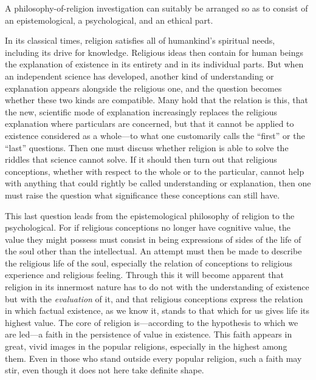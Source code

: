 \documentclass[12pt,a4paper]{book}
\newcommand{\opage}[1]{\marginnote{\footnotesize\textit{[#1]}}}
\begin{document}
A philosophy-of-religion investigation can suitably be arranged so as to
consist of an epistemological, a psychological, and an ethical part.

In its classical times, religion satisfies all of humankind's spiritual
needs, including its drive for knowledge. Religious ideas then contain
for human beings the explanation of existence in its entirety and in its
individual parts. But when an independent science has developed, another
kind of understanding or explanation appears alongside the religious
one, and the question becomes whether these two kinds are compatible.
Many hold that the relation is this, that the new, scientific mode of
explanation increasingly replaces the religious explanation where
particulars are concerned, but that it cannot be applied to existence
considered as a whole---to what one customarily calls the ``first'' or
the ``last'' questions. Then one must discuss whether religion is able
to solve the riddles that science cannot solve. If it should then turn
out that religious conceptions, whether with respect to the whole or to
the particular, cannot help with anything that could rightly be called
understanding or explanation, then one must raise the question what
significance these conceptions can still have.

This last question leads from the epistemological philosophy of religion
to the psychological. For if religious conceptions no longer have
cognitive value, the value they might possess must consist in being
expressions of sides of the life of the soul other than the
intellectual. An attempt must then be made to describe the religious life
of the soul, especially the relation of conceptions to religious
experience and religious feeling. Through this it will become apparent
that religion in its innermost nature has to do not with the
understanding of existence but with the \emph{evaluation} of it, and
that religious conceptions express the relation in which factual
existence, as we know it, stands to that which for us gives life its
highest value. The core of religion is---according to the hypothesis to
which we are led---a faith in the persistence of value in 
\opage{7}existence.
This faith appears in great, vivid images in the popular religions,
especially in the highest among them. Even in those who stand outside
every popular religion, such a faith may stir, even though it does not
here take definite shape.
\end{document}
